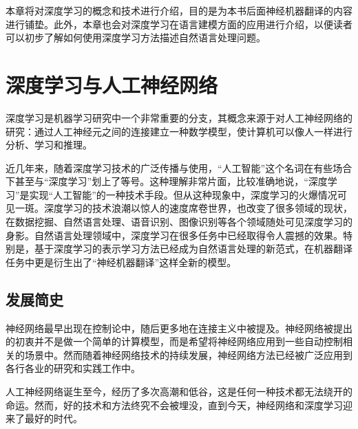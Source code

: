 \parinterval 本章将对深度学习的概念和技术进行介绍，目的是为本书后面神经机器翻译的内容进行铺垫。此外，本章也会对深度学习在语言建模方面的应用进行介绍，以便读者可以初步了解如何使用深度学习方法描述自然语言处理问题。


\section{深度学习与人工神经网络}

\parinterval 深度学习是机器学习研究中一个非常重要的分支，其概念来源于对人工神经网络的研究：通过人工神经元之间的连接建立一种数学模型，使计算机可以像人一样进行分析、学习和推理。

\parinterval 近几年来，随着深度学习技术的广泛传播与使用，“人工智能”这个名词在有些场合下甚至与“深度学习”划上了等号。这种理解非常片面，比较准确地说，“深度学习”是实现“人工智能”的一种技术手段。但从这种现象中，深度学习的火爆情况可见一斑。深度学习的技术浪潮以惊人的速度席卷世界，也改变了很多领域的现状，在数据挖掘、自然语言处理、语音识别、图像识别等各个领域随处可见深度学习的身影。自然语言处理领域中，深度学习在很多任务中已经取得令人震撼的效果。特别是，基于深度学习的表示学习方法已经成为自然语言处理的新范式，在机器翻译任务中更是衍生出了“神经机器翻译”这样全新的模型。


\subsection{发展简史}

\parinterval 神经网络最早出现在控制论中，随后更多地在连接主义中被提及。神经网络被提出的初衷并不是做一个简单的计算模型，而是希望将神经网络应用到一些自动控制相关的场景中。然而随着神经网络技术的持续发展，神经网络方法已经被广泛应用到各行各业的研究和实践工作中。

\parinterval 人工神经网络诞生至今，经历了多次高潮和低谷，这是任何一种技术都无法绕开的命运。然而，好的技术和方法终究不会被埋没，直到今天，神经网络和深度学习迎来了最好的时代。


